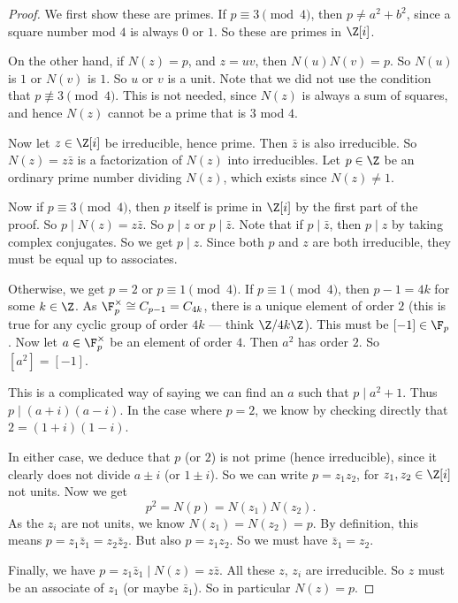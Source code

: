 \documentclass[a4paper]{article}
\begin{document}
\begin{proof}
  We first show these are primes. If $p \equiv 3 \pmod 4$, then $p \not= a^2 + b^2$, since a square number mod $4$ is always $0$ or $1$. So these are primes in $\Z[i]$.

  On the other hand, if $N(z) = p$, and $z = uv$, then $N(u) N(v) = p$. So $N(u)$ is $1$ or $N(v)$ is $1$. So $u$ or $v$ is a unit. Note that we did not use the condition that $p \not\equiv 3 \pmod 4$. This is not needed, since $N(z)$ is always a sum of squares, and hence $N(z)$ cannot be a prime that is $3$ mod $4$.

  Now let $z \in \Z[i]$ be irreducible, hence prime. Then $\bar{z}$ is also irreducible. So $N(z) = z\bar{z}$ is a factorization of $N(z)$ into irreducibles. Let $p \in \Z$ be an ordinary prime number dividing $N(z)$, which exists since $N(z) \not= 1$.

  Now if $p \equiv 3\pmod 4$, then $p$ itself is prime in $\Z[i]$ by the first part of the proof. So $p \mid N(z) = z\bar{z}$. So $p \mid z$ or $p \mid \bar{z}$. Note that if $p \mid \bar{z}$, then $p \mid z$ by taking complex conjugates. So we get $p \mid z$. Since both $p$ and $z$ are both irreducible, they must be equal up to associates.

  Otherwise, we get $p = 2$ or $p \equiv 1 \pmod 4$. If $p \equiv 1 \pmod 4$, then $p - 1 = 4k$ for some $k \in \Z$. As $\F_p^\times \cong C_{p - 1} = C_{4k}$, there is a unique element of order $2$ (this is true for any cyclic group of order $4k$ --- think $\Z/4k\Z$). This must be $[-1] \in \F_p$. Now let $a \in \F_p^\times$ be an element of order $4$. Then $a^2$ has order $2$. So $[a^2] = [-1]$.

  This is a complicated way of saying we can find an $a$ such that $p \mid a^2 + 1$. Thus $p \mid (a + i)(a - i)$. In the case where $p = 2$, we know by checking directly that $2 = (1 + i)(1 - i)$.

  In either case, we deduce that $p$ (or $2$) is not prime (hence irreducible), since it clearly does not divide $a \pm i$ (or $1 \pm i$). So we can write $p = z_1 z_2$, for $z_1, z_2 \in \Z[i]$ not units. Now we get
  \[
    p^2 = N(p) = N(z_1) N(z_2).
  \]
  As the $z_i$ are not units, we know $N(z_1) = N(z_2) = p$. By definition, this means $p = z_1 \bar{z}_1 = z_2 \bar{z}_2$. But also $p = z_1 z_2$. So we must have $\bar{z}_1 = z_2$.

  Finally, we have $p = z_1 \bar{z}_1 \mid N(z) = z\bar{z}$. All these $z$, $z_i$ are irreducible. So $z$ must be an associate of $z_1$ (or maybe $\bar{z}_1$). So in particular $N(z) = p$.
\end{proof}
\end{document}
